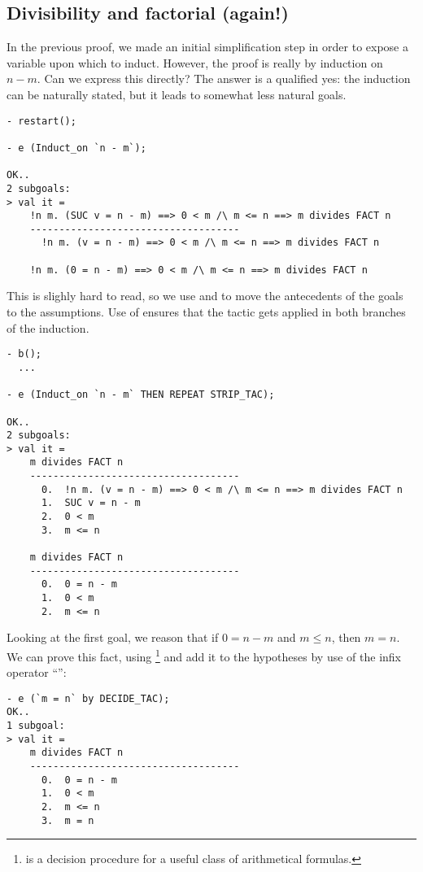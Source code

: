 \subsection{Divisibility and factorial (again!)}

In the previous proof, we made an initial simplification step in order
to expose a variable upon which to induct. However, the proof is
really by induction on $n - m$. Can we express this directly? The
answer is a qualified yes: the induction can be naturally stated, but
it leads to somewhat less natural goals.
\begin{session}
\begin{verbatim}
- restart();

- e (Induct_on `n - m`);

OK..
2 subgoals:
> val it =
    !n m. (SUC v = n - m) ==> 0 < m /\ m <= n ==> m divides FACT n
    ------------------------------------
      !n m. (v = n - m) ==> 0 < m /\ m <= n ==> m divides FACT n

    !n m. (0 = n - m) ==> 0 < m /\ m <= n ==> m divides FACT n
\end{verbatim}
\end{session}
    This is slighly hard to read, so we use  and
     to move the antecedents of the goals to the
    assumptions. Use of  ensures that the tactic gets applied
    in both branches of the induction.
\begin{session}
\begin{verbatim}
- b();
  ...

- e (Induct_on `n - m` THEN REPEAT STRIP_TAC);

OK..
2 subgoals:
> val it =
    m divides FACT n
    ------------------------------------
      0.  !n m. (v = n - m) ==> 0 < m /\ m <= n ==> m divides FACT n
      1.  SUC v = n - m
      2.  0 < m
      3.  m <= n

    m divides FACT n
    ------------------------------------
      0.  0 = n - m
      1.  0 < m
      2.  m <= n
\end{verbatim}
\end{session}
Looking at the first goal, we reason that if $0 = n - m$ and $m
\leq n$, then $m = n$. We can prove this fact, using \footnote
{ is a decision procedure for a useful class of arithmetical formulas.}
and add it to the hypotheses by use of the infix operator ``'':
\begin{session}
\begin{verbatim}
- e (`m = n` by DECIDE_TAC);
OK..
1 subgoal:
> val it =
    m divides FACT n
    ------------------------------------
      0.  0 = n - m
      1.  0 < m
      2.  m <= n
      3.  m = n
\end{verbatim}
\end{session}

